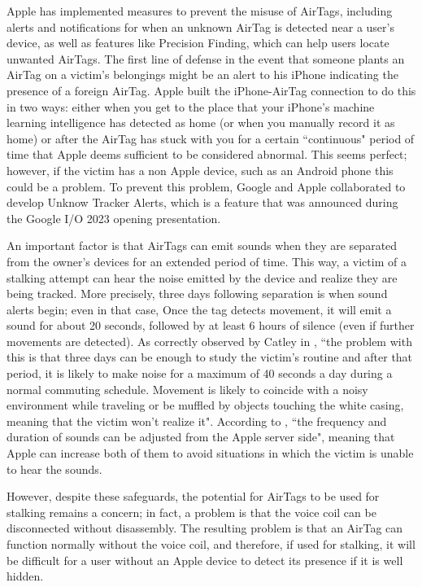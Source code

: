 \documentclass[english]{article}
\begin{document}
Apple has implemented measures to prevent the misuse of AirTags, including alerts and notifications for when an unknown AirTag is detected near a user's device, as well as features like Precision Finding, which can help users locate unwanted AirTags. The first line of defense in the event that someone plants an AirTag on a victim's belongings might be an alert to his iPhone indicating the presence of a foreign AirTag. Apple built the iPhone-AirTag connection to do this in two ways: either when you get to the place that your iPhone's machine learning intelligence has detected as home (or when you manually record it as home) or after the AirTag has stuck with you for a certain ``continuous" period of time that Apple deems sufficient to be considered abnormal. This seems perfect; however, if the victim has a non Apple device, such as an Android phone this could be a problem. To prevent this problem, Google and Apple collaborated to develop Unknow Tracker Alerts, which is a feature that was announced during the Google I/O 2023 opening presentation.

An important factor is that AirTags can emit sounds when they are separated from the owner's devices for an extended period of time. This way, a victim of a stalking attempt can hear the noise emitted by the device and realize they are being tracked. More precisely, three days following separation is when sound alerts begin; even in that case, Once the tag detects movement, it will emit a sound for about 20 seconds, followed by at least 6 hours of silence (even if further movements are detected). As correctly observed by Catley in \cite{reverse}, ``the problem with this is that three days can be enough to study the victim's routine and after that period, it is likely to make noise for a maximum of 40 seconds a day during a normal commuting schedule. Movement is likely to coincide with a noisy environment while traveling or be muffled by objects touching the white casing, meaning that the victim won't realize it". According to \cite{server}, ``the frequency and duration of sounds can be adjusted from the Apple server side", meaning that Apple can increase both of them to avoid situations in which the victim is unable to hear the sounds.

However, despite these safeguards, the potential for AirTags to be used for stalking remains a concern; in fact, a problem is that the voice coil can be disconnected without disassembly. The resulting problem is that an AirTag can function normally without the voice coil, and therefore, if used for stalking, it will be difficult for a user without an Apple device to detect its presence if it is well hidden.
\end{document}
